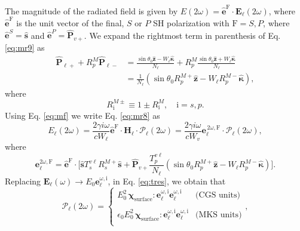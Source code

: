 The magnitude of the radiated field is given by $E(2\omega) =
\hat{\mathbf{e}}^{\mathrm{F}}\cdot\mathbf{E}_{\ell}(2\omega)$, where
$\hat{\mathbf{e}}^{\mathrm{F}}$ is the unit vector of the final, $S$ or $P$ SH
polarization with $\mathrm{F}=S,P$, where $\hat{\mathbf{e}}^S=\hat{\mathbf{s}}$
and $\hat{\mathbf{e}}^P=\hat{\mathbf{P}}_{v+}$. We expand the rightmost term in
parenthesis of Eq. \eqref{eq:mr9} as
\begin{equation}
\begin{split}
\hat{\mathbf{P}}_{\ell +} + R^{M}_{p}\hat{\mathbf{P}}_{\ell -}
&= \frac{\sin\theta_{0}\hat{\mathbf{z}} - W_{\ell}\hat{\boldsymbol{\kappa}}}
        {N_{\ell}}
 + R^{M}_{p}
   \frac{\sin\theta_{0}\hat{\mathbf{z}} + W_{\ell}\hat{\boldsymbol{\kappa}}}
        {N_{\ell}}\\
&= \frac{1}{N_{\ell}}
\left(
\sin\theta_{0}R^{M+}_{p}\hat{\mathbf{z}}
- W_{\ell}R^{M-}_{p}\hat{\boldsymbol{\kappa}}
\right),
\end{split}
\end{equation}
where
\begin{equation}\label{eq:rm}
R^{M\pm}_{\mathrm{i}}\equiv 1 \pm R^{M}_{\mathrm{i}}, \quad \mathrm{i}=s,p.
\end{equation}
Using Eq. \eqref{eq:mf} we write Eq. \eqref{eq:mr8} as
\begin{equation}\label{eq:r10}
E_{\ell}(2\omega) = \frac{2\gamma i\omega}{cW_\ell}
\hat{\mathbf{e}}^{\mathrm{F}}\cdot\mathbf{H}_{\ell}\cdot
\boldsymbol{\mathcal{P}}_{\ell}(2\omega) 
= \frac{2\gamma i\omega}{cW_{v}}
\mathbf{e}^{\,2\omega,\mathrm{F}}_{\ell}\cdot
\boldsymbol{\mathcal{P}}_{\ell}(2\omega),
\end{equation}
where
\begin{equation}\label{eq:r12mm}
\mathbf{e}^{2\omega,\mathrm{F}}_{\ell} =\hat{\mathbf{e}}^{\mathrm{F}}\cdot 
\Bigg[
\hat{\mathbf{s}}T_{s}^{v\ell}R^{M+}_{s}\hat{\mathbf{s}} + 
\hat{\mathbf{P}}_{v+}
\frac{T^{v\ell}_{p}}
     {N_{\ell}}
\left(
\sin\theta_{0}R^{M+}_{p}\hat{\mathbf{z}}
- W_{\ell}R^{M-}_{p}\hat{\boldsymbol{\kappa}}
\right) 
\Bigg]. 
\end{equation}  
Replacing $\mathbf{E}_{\ell}(\omega)\to E_0\mathbf{e}^{\omega,\mathrm{i}}_\ell$,
in Eq. \eqref{eq:tres}, we obtain that
\begin{equation}\label{eq:m4}
\boldsymbol{\mathcal{P}}_{\ell}(2\omega) = 
\left\{
\begin{array}{cc}  
E^{2}_{0}\,
\boldsymbol{\chi}_{\mathrm{surface}}:\mathbf{e}^{\omega,\mathrm{i}}_{\ell}
                  \mathbf{e}^{\omega,\mathrm{i}}_{\ell}
& \text{(CGS units)}\\\\
\epsilon_{0}E^{2}_{0}\,
\boldsymbol{\chi}_{\mathrm{surface}}:\mathbf{e}^{\omega,\mathrm{i}}_{\ell}
                  \mathbf{e}^{\omega,\mathrm{i}}_{\ell}
& \text{(MKS units)}\\
\end{array}
\right.,
\end{equation}
